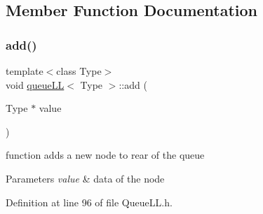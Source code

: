 \subsection{Member Function Documentation}
\mbox{\label{classqueue_l_l_adcbcc26433da2c9d17b6cf0802d1d7d2}} 
\subsubsection{\texorpdfstring{add()}{add()}}
{\footnotesize\ttfamily template$<$class Type$>$ \\
void \hyperlink{classqueue_l_l}{queue\+LL}$<$ Type $>$\+::add (\begin{DoxyParamCaption}\item[{Type $\ast$}]{value }\end{DoxyParamCaption})\hspace{0.3cm}{\ttfamily [inline]}}

function adds a new node to rear of the queue 
\begin{DoxyParams}{Parameters}
{\em value} & data of the node \\
\hline
\end{DoxyParams}


Definition at line 96 of file Queue\+L\+L.\+h.


